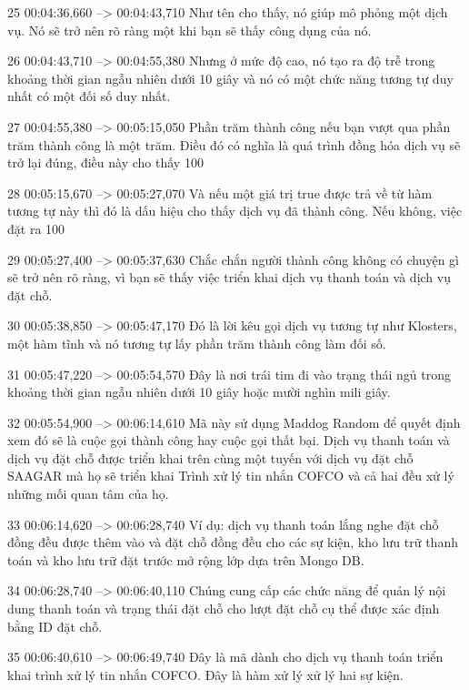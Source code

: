 25
00:04:36,660 --> 00:04:43,710
Như tên cho thấy, nó giúp mô phỏng một dịch vụ.  Nó sẽ trở nên rõ ràng một khi bạn sẽ thấy công dụng của nó.

26
00:04:43,710 --> 00:04:55,380
Nhưng ở mức độ cao, nó tạo ra độ trễ trong khoảng thời gian ngẫu nhiên dưới 10 giây và nó có một chức năng tương tự duy nhất có một đối số duy nhất.

27
00:04:55,380 --> 00:05:15,050
Phần trăm thành công nếu bạn vượt qua phần trăm thành công là một trăm.  Điều đó có nghĩa là quá trình đồng hóa dịch vụ sẽ trở lại đúng, điều này cho thấy 100%

28
00:05:15,670 --> 00:05:27,070
Và nếu một giá trị true được trả về từ hàm tương tự này thì đó là dấu hiệu cho thấy dịch vụ đã thành công.  Nếu không, việc đặt ra 100%

29
00:05:27,400 --> 00:05:37,630
Chắc chắn người thành công không có chuyện gì sẽ trở nên rõ ràng, vì bạn sẽ thấy việc triển khai dịch vụ thanh toán và dịch vụ đặt chỗ.

30
00:05:38,850 --> 00:05:47,170
Đó là lời kêu gọi dịch vụ tương tự như Klosters, một hàm tĩnh và nó tương tự lấy phần trăm thành công làm đối số.

31
00:05:47,220 --> 00:05:54,570
Đây là nơi trái tim đi vào trạng thái ngủ trong khoảng thời gian ngẫu nhiên dưới 10 giây hoặc mười nghìn mili giây.

32
00:05:54,900 --> 00:06:14,610
Mã này sử dụng Maddog Random để quyết định xem đó sẽ là cuộc gọi thành công hay cuộc gọi thất bại.  Dịch vụ thanh toán và dịch vụ đặt chỗ được triển khai trên cùng một tuyến với dịch vụ đặt chỗ SAAGAR mà họ sẽ triển khai Trình xử lý tin nhắn COFCO và cả hai đều xử lý những mối quan tâm của họ.

33
00:06:14,620 --> 00:06:28,740
Ví dụ: dịch vụ thanh toán lắng nghe đặt chỗ đồng đều được thêm vào và đặt chỗ đồng đều cho các sự kiện, kho lưu trữ thanh toán và kho lưu trữ đặt trước mở rộng lớp dựa trên Mongo DB.

34
00:06:28,740 --> 00:06:40,110
Chúng cung cấp các chức năng để quản lý nội dung thanh toán và trạng thái đặt chỗ cho lượt đặt chỗ cụ thể được xác định bằng ID đặt chỗ.

35
00:06:40,610 --> 00:06:49,740
Đây là mã dành cho dịch vụ thanh toán triển khai trình xử lý tin nhắn COFCO.  Đây là hàm xử lý xử lý hai sự kiện.

